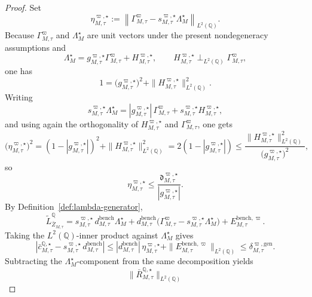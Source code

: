 \documentclass[11pt,a4paper]{amsart}
\theoremstyle{plain}
\theoremstyle{definition}
\theoremstyle{remark}
\newcommand{\QQ}{\mathbb{Q}}
\begin{document}
\begin{proof}
Set
\[
        \eta_{M,\tau}^{\varpi,\star}
        :=
        \left\|
                \Gamma_{M,\tau}^\varpi
                -
                s_{M,\tau}^{\varpi,\star}\Lambda_M^\star
        \right\|_{L^2(\QQ)}.
\]
Because \(\Gamma_{M,\tau}^\varpi\) and \(\Lambda_M^\star\) are unit vectors under the present
nondegeneracy assumptions and
\[
        \Lambda_M^\star
        =
        g_{M,\tau}^{\varpi,\star}\Gamma_{M,\tau}^\varpi
        +
        H_{M,\tau}^{\varpi,\star},
        \qquad
        H_{M,\tau}^{\varpi,\star}\perp_{L^2(\QQ)}\Gamma_{M,\tau}^\varpi,
\]
one has
\[
        1
        =
        \bigl(g_{M,\tau}^{\varpi,\star}\bigr)^2
        +
        \|H_{M,\tau}^{\varpi,\star}\|_{L^2(\QQ)}^2.
\]
Writing
\[
        s_{M,\tau}^{\varpi,\star}\Lambda_M^\star
        =
        |g_{M,\tau}^{\varpi,\star}|\,\Gamma_{M,\tau}^\varpi
        +
        s_{M,\tau}^{\varpi,\star}H_{M,\tau}^{\varpi,\star},
\]
and using again the orthogonality of \(H_{M,\tau}^{\varpi,\star}\) and
\(\Gamma_{M,\tau}^\varpi\), one gets
\[
        \bigl(\eta_{M,\tau}^{\varpi,\star}\bigr)^2
        =
        \left(
                1-|g_{M,\tau}^{\varpi,\star}|
        \right)^2
        +
        \|H_{M,\tau}^{\varpi,\star}\|_{L^2(\QQ)}^2
        =
        2\left(
                1-|g_{M,\tau}^{\varpi,\star}|
        \right)
        \le
        \frac{\|H_{M,\tau}^{\varpi,\star}\|_{L^2(\QQ)}^2}
        {\bigl(g_{M,\tau}^{\varpi,\star}\bigr)^2},
\]
so
\[
        \eta_{M,\tau}^{\varpi,\star}
        \le
        \frac{\mathfrak d_{M,\tau}^{\varpi,\star}}{|g_{M,\tau}^{\varpi,\star}|}.
\]
By Definition~\ref{def:lambda-generator},
\[
        \widetilde L_{\bar Z_{M,\tau}}^\QQ
        =
        s_{M,\tau}^{\varpi,\star}\,d_{M,\tau}^{\mathrm{bench}}\Lambda_M^\star
        +
        d_{M,\tau}^{\mathrm{bench}}
        \bigl(
                \Gamma_{M,\tau}^\varpi-s_{M,\tau}^{\varpi,\star}\Lambda_M^\star
        \bigr)
        +
        E_{M,\tau}^{\mathrm{bench},\varpi}.
\]
Taking the \(L^2(\QQ)\)-inner product against \(\Lambda_M^\star\) gives
\[
        \left|
                \bar c_{M,\tau}^{\QQ,\star}
                -
                s_{M,\tau}^{\varpi,\star}\,d_{M,\tau}^{\mathrm{bench}}
        \right|
        \le
        |d_{M,\tau}^{\mathrm{bench}}|\,\eta_{M,\tau}^{\varpi,\star}
        +
        \|E_{M,\tau}^{\mathrm{bench},\varpi}\|_{L^2(\QQ)}
        \le
        \delta_{M,\tau}^{\varpi,\mathrm{gen}}.
\]
Subtracting the \(\Lambda_M^\star\)-component from the same decomposition yields
\[
        \|\bar R_{M,\tau}^{\QQ,\star}\|_{L^2(\QQ)}
\]
\end{proof}
\end{document}
